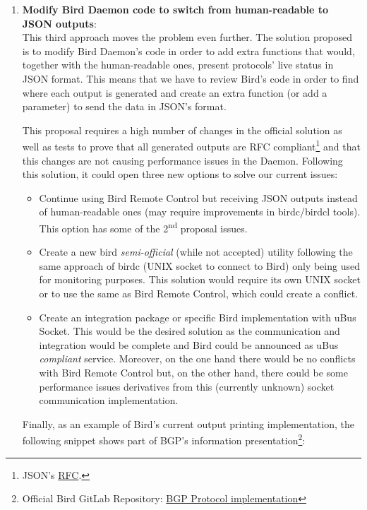 \begin{enumerate}
    \item \textbf{Modify Bird Daemon code to switch from human-readable to JSON outputs}:\\
This third approach moves the problem even further. The solution proposed is to modify Bird Daemon's code in order to add extra functions that would, together with the human-readable ones, present protocols' live status in JSON format. This means that we have to review Bird's code in order to find where each output is generated and create an extra function (or add a parameter) to send the data in JSON's format.

This proposal requires a high number of changes in the official solution as well as tests to prove that all generated outputs are RFC compliant\footnote{JSON's \href{https://tools.ietf.org/html/rfc7159}{RFC}.} and that this changes are not causing performance issues in the Daemon. Following this solution, it could open three new options to solve our current issues:
   \begin{itemize}
        \item Continue using Bird Remote Control but receiving JSON outputs instead of human-readable ones (may require improvements in birdc/birdcl tools).
        This option has some of the 2\textsuperscript{nd} proposal issues.
        \item Create a new bird \textit{semi-official} (while not accepted) utility following the same approach of birdc (UNIX socket to connect to Bird) only being used for monitoring purposes.
        This solution would require its own UNIX socket or to use the same as Bird Remote Control, which could create a conflict.
        \item Create an integration package or specific Bird implementation with uBus Socket. This would be the desired solution as the communication and integration would be complete and Bird could be announced as uBus \textit{compliant} service. Moreover, on the one hand there would be no conflicts with Bird Remote Control but, on the other hand, there could be some performance issues derivatives from this (currently unknown) socket communication implementation.
   \end{itemize}

Finally, as an example of Bird's current output printing implementation, the following snippet shows part of BGP's  information presentation\footnote{Official Bird GitLab Repository: \href{https://gitlab.labs.nic.cz/labs/bird/blob/master/proto/bgp/bgp.c}{BGP Protocol implementation}}:


\end{enumerate}
